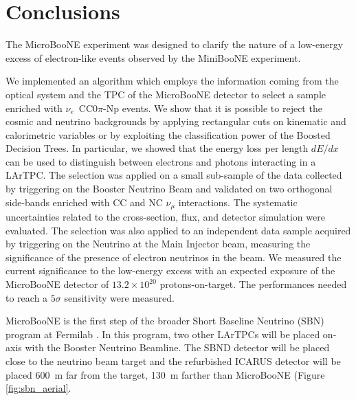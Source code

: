 \chapter{Conclusions}\label{ch:7-conclusions}
The MicroBooNE experiment was designed to clarify the nature of a low-energy excess of electron-like events observed by the MiniBooNE experiment. 

We implemented an algorithm which employs the information coming from the optical system and the TPC of the MicroBooNE detector to select a sample enriched with $\nu_e$~CC0$\pi$-Np events. We show that it is possible to reject the cosmic and neutrino backgrounds by applying rectangular cuts on kinematic and calorimetric variables or by exploiting the classification power of the Boosted Decision Trees. In particular, we showed that the energy loss per length $dE/dx$ can be used to distinguish between electrons and photons interacting in a LArTPC. The selection was applied on a small sub-sample of the data collected by triggering on the Booster Neutrino Beam and validated on two orthogonal side-bands enriched with CC and NC $\nu_{\mu}$ interactions. The systematic uncertainties related to the cross-section, flux, and detector simulation were evaluated. The selection was also applied to an independent data sample acquired by triggering on the Neutrino at the Main Injector beam, measuring the significance of the presence of electron neutrinos in the beam. 
We measured the current significance to the low-energy excess with an expected exposure of the MicroBooNE detector of $13.2\times10^{20}$ protons-on-target. The performances needed to reach a $5\sigma$ sensitivity were measured.

\vspace{1em}

MicroBooNE is the first step of the broader Short Baseline Neutrino (SBN) program at Fermilab \cite{Antonello:2015lea}. In this program, two other LArTPCs will be placed on-axis with the Booster Neutrino Beamline. The SBND detector will be placed close to the neutrino beam target and the refurbished ICARUS detector will be placed 600~m far from the target, 130~m farther than MicroBooNE (Figure \ref{fig:sbn_aerial}.

